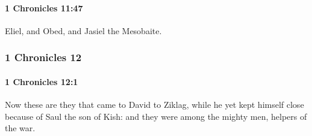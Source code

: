 		\paragraph{1 Chronicles 11:47} %
			\label{1CHRONICLES-11-47}

			Eliel, and Obed, and Jasiel the Mesobaite.

	\subsubsection{1 Chronicles 12} %
		\label{1CHRONICLES-12}

		\paragraph{1 Chronicles 12:1} %
			\label{1CHRONICLES-12-1}

			Now these are they that came to David to Ziklag, while he yet kept himself close because of Saul the son of Kish: and they were among the mighty men, helpers of the war.

